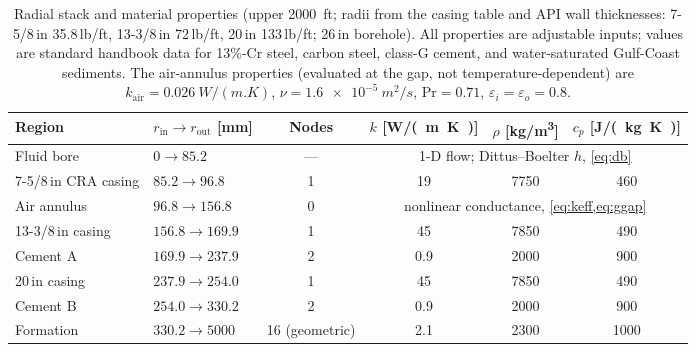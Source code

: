 \documentclass[11pt]{article}
\begin{document}
\begin{table}[htb]
\centering
\caption{Radial stack and material properties (upper \SI{2000}{ft};
radii from the casing table and API wall thicknesses: 7-5/8\,in
35.8\,lb/ft, 13-3/8\,in 72\,lb/ft, 20\,in 133\,lb/ft; 26\,in
borehole). All properties are adjustable inputs; values are standard
handbook data for 13\%-Cr steel, carbon steel, class-G cement, and
water-saturated Gulf-Coast sediments. The air-annulus properties
(evaluated at the gap, not temperature-dependent) are
$k_{\mathrm{air}} = \SI{0.026}{W/(m.K)}$,
$\nu = \SI{1.6e-5}{m^2/s}$, $\mathrm{Pr} = 0.71$,
$\varepsilon_i = \varepsilon_o = 0.8$.}
\label{tab:stack}
\begin{tabular}{llcccc}
\toprule
Region & $r_{\mathrm{in}} \to r_{\mathrm{out}}$ [mm] & Nodes &
$k$ [\si{W/(m.K)}] & $\rho$ [\si{kg/m^3}] & $c_p$ [\si{J/(kg.K)}]\\
\midrule
Fluid bore & $0 \to 85.2$ & --- & \multicolumn{3}{c}{1-D flow;
Dittus--Boelter $h$, \cref{eq:db}}\\
7-5/8\,in CRA casing & $85.2 \to 96.8$ & 1 & 19 & 7750 & 460\\
Air annulus & $96.8 \to 156.8$ & 0 &
\multicolumn{3}{c}{nonlinear conductance, \cref{eq:keff,eq:ggap}}\\
13-3/8\,in casing & $156.8 \to 169.9$ & 1 & 45 & 7850 & 490\\
Cement A & $169.9 \to 237.9$ & 2 & 0.9 & 2000 & 900\\
20\,in casing & $237.9 \to 254.0$ & 1 & 45 & 7850 & 490\\
Cement B & $254.0 \to 330.2$ & 2 & 0.9 & 2000 & 900\\
Formation & $330.2 \to 5000$ & 16 (geometric) & 2.1 & 2300 & 1000\\
\bottomrule
\end{tabular}
\end{table}
\end{document}
